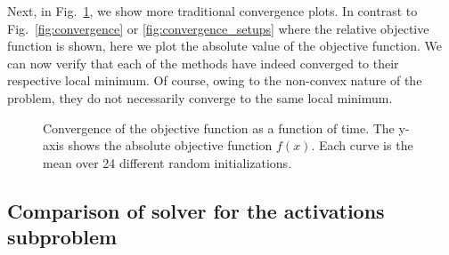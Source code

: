Next, in Fig.~\ref{fig:convergence_traditional}, we show more traditional convergence plots. In contrast to Fig.~\ref{fig:convergence} or \ref{fig:convergence_setups} where the relative objective function is shown, here we plot the absolute value of the objective function. We can now verify that each of the methods have indeed converged to their respective local minimum. Of course, owing to the non-convex nature of the problem, they do not necessarily converge to the same local minimum.
\begin{figure}[htb]
    \centering
    \vspace{-5pt}
    \caption[Convergence of the objective function as a function of time.]{Convergence of the objective function as a function of time. The y-axis shows the absolute objective function $f(x)$. Each curve is the mean over 24 different random initializations.}
    \label{fig:convergence_traditional}
\end{figure}

\subsection{Comparison of solver for the activations subproblem}

